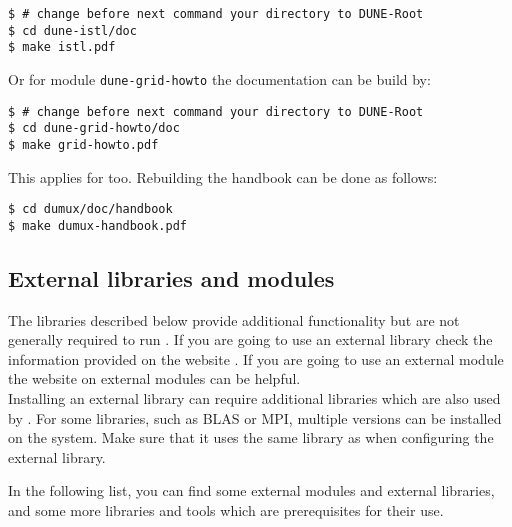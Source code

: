 \begin{lstlisting}[style=Bash]
$ # change before next command your directory to DUNE-Root
$ cd dune-istl/doc
$ make istl.pdf
\end{lstlisting}

Or for module \texttt{dune-grid-howto} the documentation can be build by: 

\begin{lstlisting}[style=Bash]
$ # change before next command your directory to DUNE-Root
$ cd dune-grid-howto/doc
$ make grid-howto.pdf
\end{lstlisting}

This applies for \Dumux too. Rebuilding the handbook can be done as follows:

\begin{lstlisting}[style=Bash]
$ cd dumux/doc/handbook
$ make dumux-handbook.pdf
\end{lstlisting}




\subsection{External libraries and modules} \label{sec:external-modules-libraries}

The libraries described below provide additional functionality but are not generally required to run \Dumux. 
If you are going to use an external library check the information provided on the \Dune website \cite{DUNE-EXT-LIB}.
If you are going to use an external \Dune module the website on external modules \cite{DUNE-EXT-MOD} can be helpful.\\


Installing an external library can require additional libraries which are also used by \Dune. 
For some libraries, such as BLAS or MPI, multiple versions can be installed on the system.
Make sure that it uses the same library as \Dune when configuring the external library.

In the following list, you can find some external modules and external libraries, and some more libraries and tools which are prerequisites for their use.

